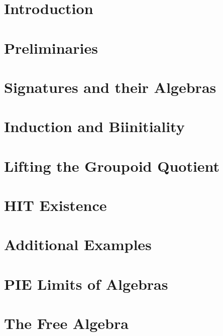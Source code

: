 \documentclass{lmcs}
\theoremstyle{plain}
\theoremstyle{definition}
\begin{document}
\maketitle

\section{Introduction}


\section{Preliminaries}
\label{sec:prelims}


\section{Signatures and their Algebras}
\label{sec:signs}


\section{Induction and Biinitiality}
\label{sec:induction}


\section{Lifting the Groupoid Quotient}
\label{sec:biadj}


\section{HIT Existence}
\label{sec:existence}


\section{Additional Examples}
\label{sec:examples}


\section{PIE Limits of Algebras}
\label{sec:finite_limits}


\section{The Free Algebra}
\label{sec:free_algebra}

\end{document}
